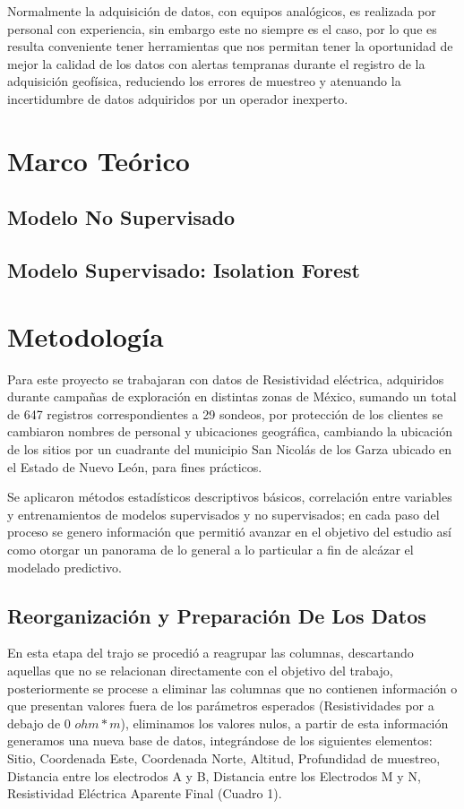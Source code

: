 \documentclass[sn-mathphys,Numbered]{sn-jnl}%
\theoremstyle{thmstyleone}%
\theoremstyle{thmstyletwo}%
\theoremstyle{thmstylethree}%
\begin{document}
Normalmente la adquisición de datos, con equipos analógicos, es realizada por personal con experiencia, sin embargo este no siempre es el caso, por lo que es resulta conveniente tener herramientas que nos permitan tener la oportunidad de mejor la calidad de los datos con alertas tempranas durante el registro de la adquisición geofísica, reduciendo los errores de muestreo y atenuando la incertidumbre de datos adquiridos por un operador inexperto.

\section{Marco Teórico}\label{sec2}

\subsection{Modelo No Supervisado}\label{subsec1}

\subsection{Modelo Supervisado: Isolation Forest}\label{subsec2}


\section{Metodología}\label{sec3}
Para este proyecto se trabajaran con datos de Resistividad eléctrica, adquiridos durante campañas de exploración en distintas zonas de México, sumando un total de 647 registros correspondientes a 29 sondeos, por protección de los clientes se cambiaron nombres de personal y ubicaciones geográfica, cambiando la ubicación de los sitios por un cuadrante del municipio San Nicolás de los Garza ubicado en el Estado de Nuevo León, para fines prácticos.

Se aplicaron métodos estadísticos descriptivos básicos, correlación entre variables y entrenamientos de modelos supervisados y no supervisados; en cada paso del proceso se genero información que permitió avanzar en el objetivo del estudio así como otorgar un panorama de lo general a lo particular a fin de alcázar el modelado predictivo.

\subsection{Reorganización y Preparación De Los Datos}\label{subsec3}

En esta etapa del trajo se procedió a reagrupar las columnas, descartando aquellas que no se relacionan directamente con el objetivo del trabajo, posteriormente se procese a eliminar las columnas que no contienen información o que presentan valores fuera de los parámetros esperados (Resistividades por a debajo de $0$ $ohm*m$), eliminamos los valores nulos, a partir de esta información generamos una nueva base de datos, integrándose de los siguientes elementos: Sitio, Coordenada Este, Coordenada Norte, Altitud, Profundidad de muestreo, Distancia entre los electrodos A y B, Distancia entre los Electrodos M y N, Resistividad Eléctrica Aparente Final (Cuadro 1).\\
\end{document}
